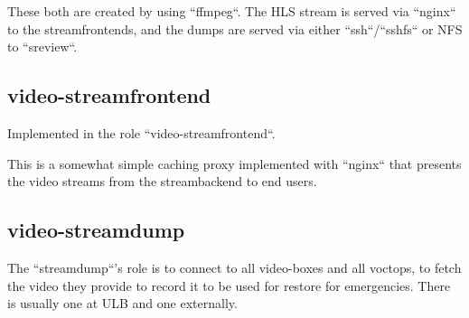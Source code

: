 \documentclass{article}
\begin{document}
These both are created by using ``ffmpeg``. The HLS stream is served via ``nginx`` to the streamfrontends, and the dumps are served via either ``ssh``/``sshfs`` or NFS to ``sreview``.

\subsection{video-streamfrontend}

Implemented in the role ``video-streamfrontend``.

This is a somewhat simple caching proxy implemented with ``nginx`` that presents the video streams from the streambackend to end users.

\subsection{video-streamdump}

The ``streamdump``'s role is to connect to all video-boxes and all voctops, to fetch the video they provide to record it to be used for restore for emergencies. There is usually one at ULB and one externally.
\end{document}
